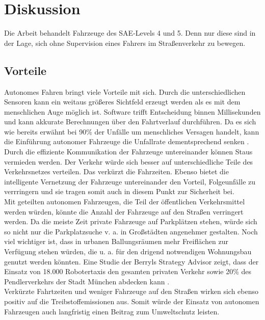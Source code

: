 \section{Diskussion}
\label{sec:diskussion}

Die Arbeit behandelt Fahrzeuge des SAE-Levels 4 und 5. Denn nur diese sind in der Lage, sich ohne Supervision eines Fahrers im Straßenverkehr zu bewegen. 

\subsection{Vorteile}

Autonomes Fahren bringt viele Vorteile mit sich. Durch die unterschiedlichen Sensoren kann ein weitaus größeres Sichtfeld erzeugt werden als es mit dem menschlichen Auge möglich ist. Software trifft Entscheidung binnen Millisekunden und kann akkurate Berechnungen über den Fahrtverlauf durchführen. 
Da es sich wie bereits erwähnt bei 90\% der Unfälle um menschliches Versagen handelt, kann die Einführung autonomer Fahrzeuge die Unfallrate dementsprechend senken \cite{roadSafty}.\\

Durch die effiziente Kommunikation der Fahrzeuge untereinander können Staus vermieden werden. Der Verkehr würde sich besser auf unterschiedliche Teile des Verkehrsnetzes verteilen. Das verkürzt die Fahrzeiten. Ebenso bietet die intelligente Vernetzung der Fahrzeuge untereinander den Vorteil, Folgeunfälle zu verrringern und sie tragen somit auch in diesem Punkt zur Sicherheit bei.\\

Mit geteilten autonomen Fahrzeugen, die Teil der öffentlichen Verkehrsmittel werden würden, könnte die Anzahl der Fahrzeuge auf den Straßen verringert werden. Da die meiste Zeit private Fahrzeuge auf Parkplätzen stehen, würde sich so nicht nur die Parkplatzsuche v. a. in Großstädten angenehmer gestalten. Noch viel wichtiger ist, dass in urbanen Ballungsräumen mehr Freiflächen zur Verfügung stehen würden, die u. a. für den drigend notwendigen Wohnungsbau genutzt werden könnten. Eine Studie der Berryls Strategy Advisor zeigt, dass der Einsatz von 18.000 Robotertaxis den gesamten privaten Verkehr sowie 20\% des Pendlerverkehrs der Stadt München abdecken kann \cite{advisors2017simulation}.\\

Verkürzte Fahrtzeiten und weniger Fahrzeuge auf den Straßen wirken sich ebenso positiv auf die Treibstoffemissionen aus. Somit würde der Einsatz von autonomen Fahrzeugen auch langfristig einen Beitrag zum Umweltschutz leisten.\\

